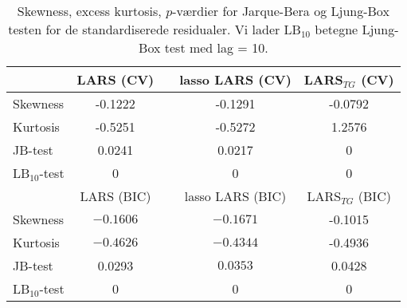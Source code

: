 \begin{table}
\center
\begin{tabular}{lcccc} 
\toprule
& LARS (CV) && lasso LARS  (CV) & LARS$_{TG}$ (CV) \\ \midrule
Skewness & -0.1222 && -0.1291 & -0.0792   \\
Kurtosis & -0.5251  && -0.5272 & 1.2576 \\
JB-test & 0.0241 &&  0.0217 & 0 \\
LB$_{10}$-test &0 && 0  & 0  \\  \bottomrule \toprule
& LARS (BIC) && lasso LARS (BIC) &  LARS$_{TG}$ (BIC) \\ \midrule
Skewness & $-0.1606$  && $-0.1671$   & -0.1015 \\
Kurtosis &   $-0.4626$ && $-0.4344 $ & -0.4936  \\
JB-test & 0.0293 &&  $0.0353$ &  0.0428\\
LB$_{10}$-test & 0 && 0  & 0\\  \bottomrule 
\end{tabular}
\caption{Skewness, excess kurtosis, $p$-værdier for Jarque-Bera og Ljung-Box testen for de standardiserede residualer. Vi lader LB$_{10}$ betegne Ljung-Box test med lag = 10. } \label{tab:lars_kryds_res_tab}
\end{table}